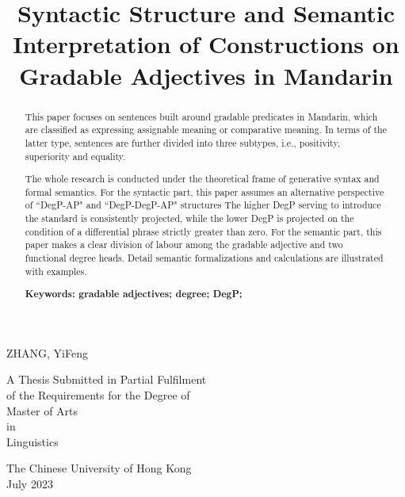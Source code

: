 \documentclass{ctexart}
\title{\LARGE{\bfseries{Syntactic Structure and Semantic Interpretation of Constructions on Gradable Adjectives in Mandarin}}}
\date{\vspace{-10ex}}
\begin{document}

{\let\newpage\relax\maketitle}

\vspace{10ex}

\begin{center}
\Large{ZHANG, YiFeng}
\end{center}

\vspace{25ex}

\begin{center}
    \Large{
        A Thesis Submitted in Partial Fulfilment \\
        of the Requirements for the Degree of \\
        Master of Arts \\
        in \\
        Linguistics
        }
\end{center}

\vspace{20ex}

\begin{center}
    \Large{
        The Chinese University of Hong Kong \\
        July 2023
        }
\end{center}

\thispagestyle{empty} %

\newpage

\begin{abstract}
    \normalsize 
    {

    \noindent
    This paper focuses on sentences built around gradable predicates in Mandarin, which are classified as expressing assignable meaning or comparative meaning. In terms of the latter type, sentences are further divided into three subtypes, i.e., positivity, superiority and equality.
    
    The whole research is conducted under the theoretical frame of generative syntax and formal semantics. For the syntactic part, this paper assumes an alternative perspective of ``DegP-AP" and ``DegP-DegP-AP" structures The higher DegP serving to introduce the standard is consistently projected, while the lower DegP is projected on the condition of a differential phrase strictly greater than zero.
    For the semantic part, this paper makes a clear division of labour among the gradable adjective and two functional degree heads. Detail semantic formalizations and calculations are illustrated with examples.
    
    \vspace{2ex}
    \bf{ Keywords: gradable adjectives; degree; DegP;}
    }
    
\end{abstract}
\end{document}
